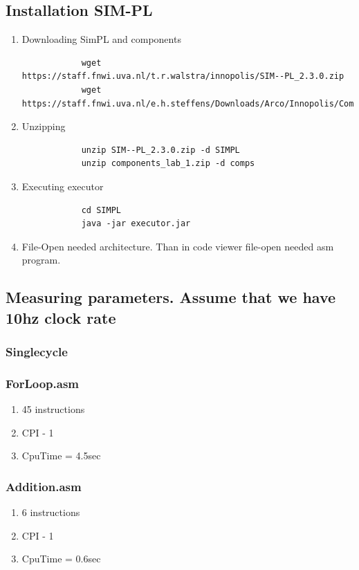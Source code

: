 \documentclass[10pt]{article}
\begin{document}
\subsection{Installation SIM-PL}
\begin{enumerate}
    \item Downloading SimPL and components
        \begin{verbatim}
            wget https://staff.fnwi.uva.nl/t.r.walstra/innopolis/SIM-­‐PL_2.3.0.zip
            wget https://staff.fnwi.uva.nl/e.h.steffens/Downloads/Arco/Innopolis/Component_Lab_1.zip    
        \end{verbatim}
    \item Unzipping
        \begin{verbatim}
            unzip SIM-­‐PL_2.3.0.zip -d SIMPL
            unzip components_lab_1.zip -d comps
        \end{verbatim}
    \item Executing executor
        \begin{verbatim}
            cd SIMPL
            java -jar executor.jar
        \end{verbatim}
    \item File-Open needed architecture. Than in code viewer file-open needed asm program. 
\end{enumerate}

\subsection{Measuring parameters. Assume that we have 10hz clock rate}
    \subsubsection{Singlecycle}
        \subsubsection{ForLoop.asm}
        \begin{enumerate}
            \item 45 instructions
            \item CPI - 1
            \item CpuTime = 4.5sec
        \end{enumerate}
        \subsubsection{Addition.asm}
        \begin{enumerate}
            \item 6 instructions
            \item CPI - 1
            \item CpuTime = 0.6sec
        \end{enumerate}
\end{document}

